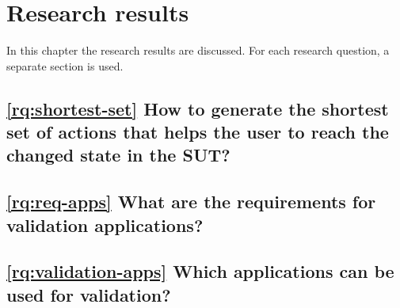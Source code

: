 \chapter{Research results}

In this chapter the research results are discussed.
For each research question, a separate section is used. 









\section{\ref{rq:shortest-set} How to generate the shortest set of actions that helps the user to reach the changed state in the SUT?}

\section{\ref{rq:req-apps} What are the requirements for validation applications?}

\section{\ref{rq:validation-apps} Which applications can be used for validation?}
